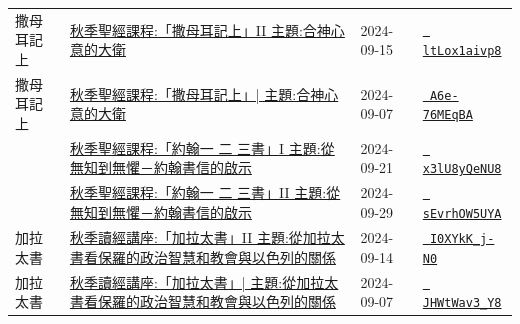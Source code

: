 \documentclass{book}
\begin{document}
{\begin{xltabular}{\textwidth}{|p{0.15\textwidth} p{0.6\textwidth}|p{0.07\textwidth} p{0.1\textwidth}|}
撒母耳記上   & \hyperref[sec:ltLox1aivp8]{秋季聖經課程:「撒母耳記上」II 主題:合神心意的大衛} & 2024-09-15 & \href{https://youtube.com/watch?v=ltLox1aivp8}{\texttt{ ltLox1aivp8}} \\
撒母耳記上   & \hyperref[sec:A6e_76MEqBA]{秋季聖經課程:「撒母耳記上」| 主題:合神心意的大衛} & 2024-09-07 & \href{https://youtube.com/watch?v=A6e-76MEqBA}{\texttt{ A6e-76MEqBA}} \\
    & \hyperref[sec:x3lU8yQeNU8]{秋季聖經課程:「約翰一 二 三書」I 主題:從無知到無懼－約翰書信的啟示} & 2024-09-21 & \href{https://youtube.com/watch?v=x3lU8yQeNU8}{\texttt{ x3lU8yQeNU8}} \\
    & \hyperref[sec:sEvrhOW5UYA]{秋季聖經課程:「約翰一 二 三書」II 主題:從無知到無懼－約翰書信的啟示} & 2024-09-29 & \href{https://youtube.com/watch?v=sEvrhOW5UYA}{\texttt{ sEvrhOW5UYA}} \\
加拉太書   & \hyperref[sec:I0XYkK_j_N0]{秋季讀經講座:「加拉太書」II 主題:從加拉太書看保羅的政治智慧和教會與以色列的關係} & 2024-09-14 & \href{https://youtube.com/watch?v=I0XYkK_j-N0}{\texttt{ I0XYkK\_j-N0}} \\
加拉太書   & \hyperref[sec:JHWtWav3_Y8]{秋季讀經講座:「加拉太書」| 主題:從加拉太書看保羅的政治智慧和教會與以色列的關係} & 2024-09-07 & \href{https://youtube.com/watch?v=JHWtWav3_Y8}{\texttt{ JHWtWav3\_Y8}} \\
\end{xltabular}
}
\newpage
\end{document}
